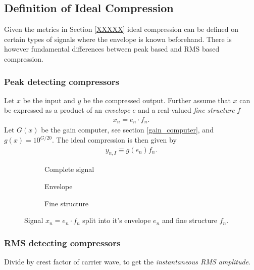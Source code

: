 \documentclass[../main2.tex]{subfiles}
\providecommand{\rootdir}{..}
\begin{document}
\subsection{Definition of Ideal Compression} \label{method_ideal_compression}
Given the metrics in Section \ref{XXXXX} ideal compression can be defined on certain types of signals where the envelope is known beforehand. There is however fundamental differences between peak based and RMS based compression.

\subsubsection{Peak detecting compressors}
Let $x$ be the input and $y$ be the compressed output. Further assume that $x$ can be expressed as a product of an \emph{envelope} $e$ and a real-valued \emph{fine structure} $f$ 
\begin{align}
x_n = e_n\cdot f_n.
\end{align}
Let $G(x)$ be the gain computer, see section \ref{gain_computer}, and $g(x) = 10^{G/20}$. The ideal compression is then given by
\begin{align}
y_{n,I} \equiv g(e_n) f_n. 
\end{align}


\begin{figure}
\captionsetup{justification=centering}
\begin{subfigure}{\linewidth}
\centering
\centerline{}
\caption{Complete signal}
\label{fig:signal_env_fine_struct}
\end{subfigure}
\par\bigskip
\begin{subfigure}{.5\linewidth}
\centering

\caption{Envelope}
\label{fig:signal_env}
\end{subfigure}
\begin{subfigure}{.5\linewidth}
\centering

\caption{Fine structure}
\label{fig:signal_fine_struct}
\end{subfigure}%
\caption{Signal $x_n = e_n\cdot f_n$ split into it's envelope $e_n$ and fine structure $f_n$.}
\label{fig:analytic_signal}
\end{figure}

\subsubsection{RMS detecting compressors}
Divide by crest factor of carrier wave, to get the \emph{instantaneous RMS amplitude}.
\end{document}
